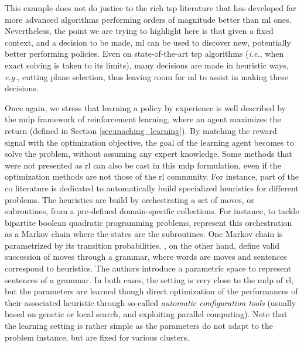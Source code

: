 \documentclass[11pt]{article}
\begin{document}
		This example does not do justice to the rich \gls{tsp} literature that has developed far more
		advanced algorithms performing orders of magnitude better than \gls{ml} ones.
		Nevertheless, the point we are trying to highlight here is that given a fixed context, and a
		decision to be made, \gls{ml} can be used to discover new, potentially better performing policies.
		Even on state-of-the-art \gls{tsp} algorithms (\textit{i.e.}, when exact solving is taken to its
		limits), many decisions are made in heuristic ways, \textit{e.g.}, cutting plane selection, thus
		leaving room for \gls{ml} to assist in making these decisions.

		Once again, we stress that learning a policy by experience is well described by the \gls{mdp}
		framework of reinforcement learning, where an agent maximizes the return (defined in Section
		\ref{sec:maching_learning}).
		By matching the reward signal with the optimization objective, the goal of the learning agent
		becomes to solve the problem, without assuming any expert knowledge.
		Some methods that were not presented as \gls{rl} can also be cast in this \gls{mdp}
		formulation, even if the optimization methods are not those of the \gls{rl} community.
		For instance, part of the \gls{co} literature is dedicated to automatically build specialized
		heuristics for different problems.
		The heuristics are build by orchestrating a set of moves, or subroutines, from a pre-defined
		domain-specific collections.
		For instance, to tackle bipartite boolean quadratic programming problems,
		\cite{KarapetyanMarkov2017} represent this orchestration as a Markov chain where the states are the
		subroutines.
		One Markov chain is parametrized by its transition probabilities.
		\cite{MasciaGrammar2014}, on the other hand, define valid succession of moves
		through a grammar, where words are moves and sentences correspond to heuristics.
		The authors introduce a parametric space to represent sentences of a grammar.
		In both cases, the setting is very close to the \gls{mdp} of \gls{rl}, but the parameters are
		learned though direct optimization of the performances of their associated heuristic through
		so-called \emph{automatic configuration tools} (usually based on genetic or local search, and
		exploiting parallel computing).
		Note that the learning setting is rather simple as the parameters do not adapt to the problem
		instance, but are fixed for various clusters.
\end{document}
